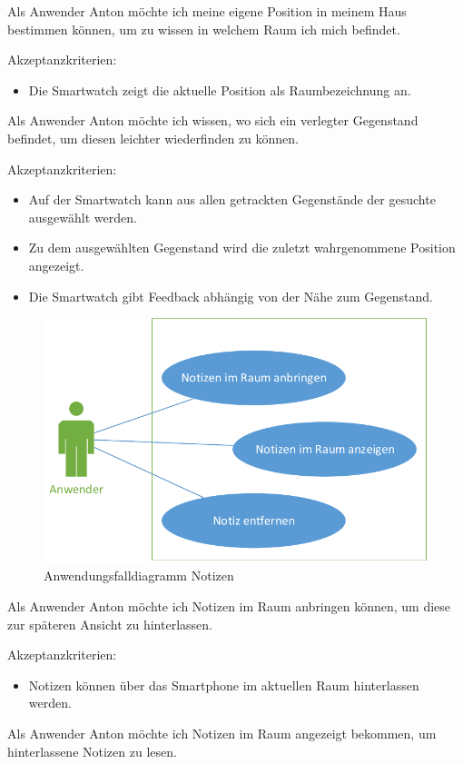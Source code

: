 Als Anwender Anton möchte ich meine eigene Position in meinem Haus bestimmen können, um zu wissen in welchem Raum ich mich befindet. 

Akzeptanzkriterien:
\begin{itemize}
\item Die Smartwatch zeigt die aktuelle Position als Raumbezeichnung an.
\end{itemize}

Als Anwender Anton möchte ich wissen, wo sich ein verlegter Gegenstand befindet, um diesen leichter wiederfinden zu können.

Akzeptanzkriterien:
\begin{itemize}
\item Auf der Smartwatch kann aus allen getrackten Gegenstände der gesuchte ausgewählt werden.
\item Zu dem ausgewählten Gegenstand wird die zuletzt wahrgenommene Position angezeigt.
\item Die Smartwatch gibt Feedback abhängig von der Nähe zum Gegenstand.
\end{itemize}


\begin{figure}[H]
\centering
\includegraphics[width=0.7\linewidth]{Bilder/UseCase-Notizen}
\caption{Anwendungsfalldiagramm Notizen}
\label{fig:UseCase-Notizen}
\end{figure}

Als Anwender Anton möchte ich Notizen im Raum anbringen können, um diese zur späteren Ansicht zu hinterlassen.

Akzeptanzkriterien:
\begin{itemize}
\item Notizen können über das Smartphone im aktuellen Raum hinterlassen werden.
\end{itemize}

Als Anwender Anton möchte ich Notizen im Raum angezeigt bekommen, um hinterlassene Notizen zu lesen.

